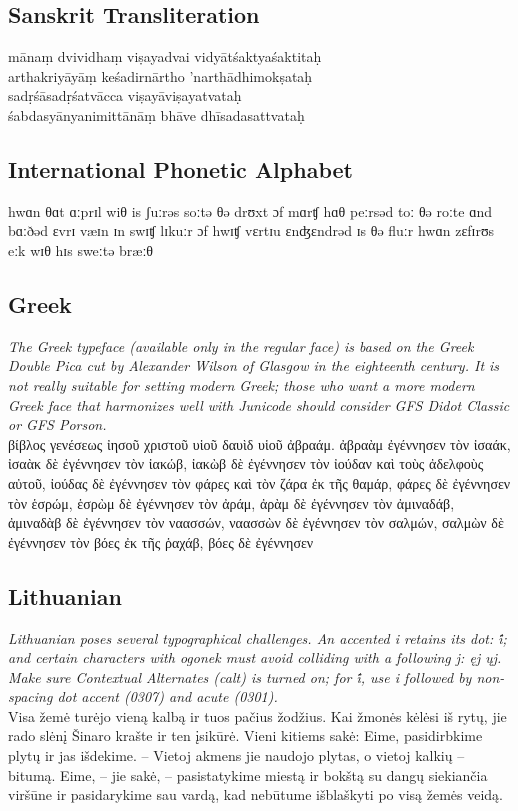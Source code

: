 \documentclass[a4paper]{article}
\begin{document}
\subsection*{Sanskrit Transliteration}

\noindent mānaṃ dvividhaṃ viṣayadvai vidyātśaktyaśaktitaḥ \\
     arthakriyāyāṃ keśadirnārtho ’narthādhimokṣataḥ\\[1ex]
sadṛśāsadṛśatvācca viṣayāviṣayatvataḥ \\
     śabdasyānyanimittānāṃ bhāve dhīsadasattvataḥ

\subsection*{International Phonetic Alphabet}
hwɑn θɑt ɑːprɪl wiθ is ʃuːrəs soːtə θə drʊxt ɔf mɑrʧ hɑθ peːrsəd toː
θə roːte ɑnd bɑːðəd ɛvrɪ væɪn ɪn swɪʧ lɪkuːr ɔf hwɪʧ vɛrtɪu
ɛnʤɛndrəd ɪs θə fluːr hwɑn zɛfɪrʊs eːk wɪθ hɪs sweːtə bræːθ

\subsection*{Greek}

{\small\itshape The Greek typeface (available only in the regular
  face) is based on the Greek Double Pica cut by Alexander Wilson of
  Glasgow in the eighteenth century. It is not really suitable for
  setting modern Greek; those who want a more modern Greek face that
  harmonizes well with Junicode should consider GFS Didot
  Classic or GFS Porson.}\\[1ex]
βίβλος
γενέσεως ἰησοῦ χριστοῦ υἱοῦ δαυὶδ
υἱοῦ ἀβραάμ.
ἀβραὰμ
ἐγέννησεν τὸν ἰσαάκ, ἰσαὰκ δὲ ἐγέννησεν
τὸν ἰακώβ, ἰακὼβ δὲ ἐγέννησεν τὸν
ἰούδαν καὶ τοὺς ἀδελφοὺς αὐτοῦ,
ἰούδας
δὲ ἐγέννησεν τὸν φάρες καὶ τὸν ζάρα
ἐκ τῆς θαμάρ, φάρες δὲ ἐγέννησεν τὸν
ἑσρώμ, ἑσρὼμ δὲ ἐγέννησεν τὸν ἀράμ,
ἀρὰμ
δὲ ἐγέννησεν τὸν ἀμιναδάβ, ἀμιναδὰβ
δὲ ἐγέννησεν τὸν ναασσών, ναασσὼν δὲ
ἐγέννησεν τὸν σαλμών,
σαλμὼν
δὲ ἐγέννησεν τὸν βόες ἐκ τῆς ῥαχάβ,
βόες δὲ ἐγέννησεν

\subsection*{Lithuanian}

{\small\itshape Lithuanian poses several typographical challenges. An
  accented i retains its dot: i̇́; and certain characters with ogonek
  must avoid colliding with a following j:
  {\upshape{} ęj ųj}. Make sure
  Contextual Alternates (calt) is turned on; for i̇́, use i followed
  by non-spacing dot accent (0307) and acute (0301).}\\[1ex]
Visa žemė turėjo vieną kalbą ir tuos pačius žodžius.  Kai žmonės
kėlėsi iš rytų, jie rado slėnį Šinaro krašte ir ten įsikūrė.  Vieni
kitiems sakė: Eime, pasidirbkime plytų ir jas išdekime. – Vietoj
akmens jie naudojo plytas, o vietoj kalkių – bitumą.  Eime, – jie
sakė, – pasistatykime miestą ir bokštą su dangų siekiančia viršūne ir
pasidarykime sau vardą, kad nebūtume išblaškyti po visą žemės veidą.
\end{document}
